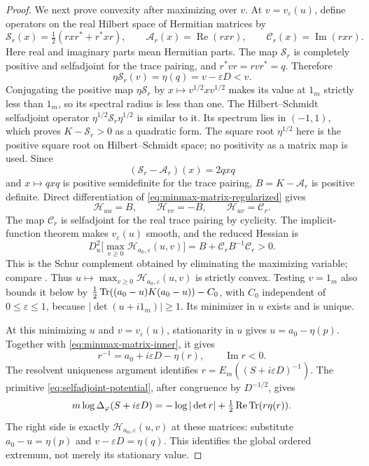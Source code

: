 \begin{proof}
We next prove convexity after maximizing over $v$.
At $v=v_\varepsilon(u)$, define operators on the real Hilbert space of Hermitian matrices by
\[
 \mathcal S_r(x)=\tfrac12(rxr^*+r^*xr),\qquad
 \mathcal A_r(x)=\operatorname{Re}(rxr),\qquad
 \mathcal C_r(x)=\operatorname{Im}(rxr).
\]
Here real and imaginary parts mean Hermitian parts.
The map $\mathcal S_r$ is completely positive and selfadjoint for the trace pairing, and $r^*vr=rvr^*=q$.
Therefore
\[
 \eta\mathcal S_r(v)=\eta(q)=v-\varepsilon D<v.
\]
Conjugating the positive map $\eta\mathcal S_r$ by $x\mapsto v^{1/2}xv^{1/2}$ makes its value at $1_m$ strictly less than $1_m$, so its spectral radius is less than one.
The Hilbert--Schmidt selfadjoint operator $\eta^{1/2}\mathcal S_r\eta^{1/2}$ is similar to it.
Its spectrum lies in $(-1,1)$, which proves $K-\mathcal S_r>0$ as a quadratic form.
The square root $\eta^{1/2}$ here is the positive square root on Hilbert--Schmidt space; no positivity as a matrix map is used.
Since
\[
 (\mathcal S_r-\mathcal A_r)(x)=2qxq
\]
and $x\mapsto qxq$ is positive semidefinite for the trace pairing, $B=K-\mathcal A_r$ is positive definite.
Direct differentiation of \eqref{eq:minmax-matrix-regularized} gives
\[
 \mathcal H_{uu}=B,\qquad
 \mathcal H_{vv}=-B,\qquad
 \mathcal H_{uv}=\mathcal C_r.
\]
The map $\mathcal C_r$ is selfadjoint for the real trace pairing by cyclicity.
The implicit-function theorem makes $v_\varepsilon(u)$ smooth, and the reduced Hessian is
\begin{equation}\label{eq:minmax-matrix-hessian}
 D_u^2\bigl[\max_{v\ge0}\mathcal H_{a_0,\varepsilon}(u,v)\bigr]
       =B+\mathcal C_r B^{-1}\mathcal C_r>0.
\end{equation}
This is the Schur complement obtained by eliminating the maximizing variable; compare \cite[Appendix A.5.5]{BV04}.
Thus $u\mapsto\max_{v\ge0}\mathcal H_{a_0,\varepsilon}(u,v)$ is strictly convex.
Testing $v=1_m$ also bounds it below by $\frac12\operatorname{Tr}((a_0-u)K(a_0-u))-C_0$, with $C_0$ independent of $0\le\varepsilon\le1$, because $|\det(u+i1_m)|\ge1$.
Its minimizer in $u$ exists and is unique.

At this minimizing $u$ and $v=v_\varepsilon(u)$, stationarity in $u$ gives $u=a_0-\eta(p)$.
Together with \eqref{eq:minmax-matrix-inner}, it gives
\[
 r^{-1}=a_0+i\varepsilon D-\eta(r),
 \qquad \operatorname{Im}r<0.
\]
The resolvent uniqueness argument identifies $r=E_m((S+i\varepsilon D)^{-1})$.
The primitive \eqref{eq:selfadjoint-potential}, after congruence by $D^{-1/2}$, gives
\begin{equation}\label{eq:minmax-matrix-value}
 m\log\Delta_\varphi(S+i\varepsilon D)
 =-\log|\det r|
       +\tfrac12\operatorname{Re}\operatorname{Tr}(r\eta(r)).
\end{equation}
The right side is exactly $\mathcal H_{a_0,\varepsilon}(u,v)$ at these matrices: substitute $a_0-u=\eta(p)$ and $v-\varepsilon D=\eta(q)$.
This identifies the global ordered extremum, not merely its stationary value.


\end{proof}
